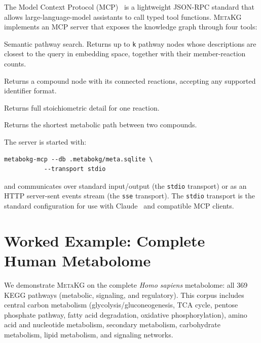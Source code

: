 \documentclass[10pt]{article}
\begin{document}
The Model Context Protocol (MCP)~\citep{anthropic2024mcp} is a
lightweight JSON-RPC standard that allows large-language-model assistants to
call typed tool functions. \textsc{MetaKG} implements an MCP server that
exposes the knowledge graph through four tools:

\begin{description}[leftmargin=*,itemsep=2pt]
  \item[\texttt{query\_pathway(name, k)}] Semantic pathway search. Returns
    up to \texttt{k} pathway nodes whose descriptions are closest to the
    query in embedding space, together with their member-reaction counts.
  \item[\texttt{get\_compound(id)}] Returns a compound node with its
    connected reactions, accepting any supported identifier format.
  \item[\texttt{get\_reaction(id)}] Returns full stoichiometric detail for
    one reaction.
  \item[\texttt{find\_path(a, b, max\_hops)}] Returns the shortest metabolic
    path between two compounds.
\end{description}

The server is started with:

\begin{lstlisting}[style=bash]
metabokg-mcp --db .metabokg/meta.sqlite \
           --transport stdio
\end{lstlisting}

\noindent and communicates over standard input/output (the \texttt{stdio}
transport) or as an HTTP server-sent events stream (the \texttt{sse}
transport). The \texttt{stdio} transport is the standard configuration for
use with Claude~\citep{anthropic2024claude} and compatible MCP clients.

\section{Worked Example: Complete Human Metabolome}
\label{sec:usage}

We demonstrate \textsc{MetaKG} on the complete \textit{Homo sapiens}
metabolome: all 369 KEGG pathways (metabolic, signaling, and regulatory).
This corpus includes central carbon metabolism (glycolysis/gluconeogenesis,
TCA cycle, pentose phosphate pathway, fatty acid degradation, oxidative
phosphorylation), amino acid and nucleotide metabolism, secondary metabolism,
carbohydrate metabolism, lipid metabolism, and signaling networks.
\end{document}
